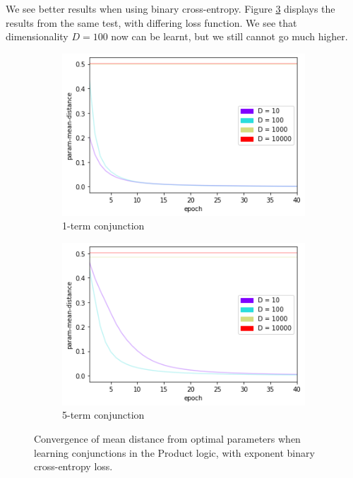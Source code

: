 We see better results when using binary cross-entropy. Figure \ref{fig:conjconvnokeepnbce} displays the results from the same test, with differing loss function. We see that dimensionality $D=100$ now can be learnt, but we still cannot go much higher.

\begin{figure}[h]
    \centering
    \begin{subfigure}[b]{0.48\textwidth}
        \centering
        \includegraphics[width=\textwidth]{imgs/conj-pmd-prod-nokeepn-1t-bce.png}
        \caption{1-term conjunction}
        \label{fig:conjconvnokeepn1bce}
    \end{subfigure}
    \begin{subfigure}[b]{0.48\textwidth}
        \centering
        \includegraphics[width=\textwidth]{imgs/conj-pmd-prod-nokeepn-5t-bce.png}
        \caption{5-term conjunction}
        \label{fig:conjconvnokeepn5bce}
    \end{subfigure}
       \caption{Convergence of mean distance from optimal parameters when learning conjunctions in the Product logic, with exponent binary cross-entropy loss.}
       \label{fig:conjconvnokeepnbce}
\end{figure}

